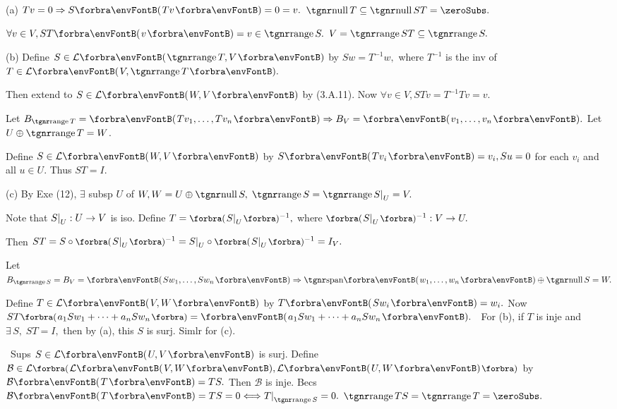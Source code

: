 \par\quad
(a) $Tv=0\Rightarrow S\Par{Tv}=0=v.$ \Or $\null T\subseteq\null ST=\zeroSubs.$\par\quad\Ha
$\forall v\in V,ST\Par{v}=v\in\range S.$ \;\Or $V=\range ST\subseteq\range S.$\par\vspace{2pt}\quad
(b) Define $S\in\Lm{\range T,V}$ by $Sw=T^{-1}w,$ {where $T^{-1}$ is the inv of $T\in\Lm{V,\range T}.$}\par\quad\Hb
Then extend to $S\in\Lm{W,V}$ by (3.A.11). Now $\forall v\in V,STv=T^{-1}Tv=v.$\par\vspace{4pt}\quad\Hb
\Or {} \;Let $B_{\range T}=\Par{Tv_1,\dots,Tv_n}\Rightarrow B_V=\Par{v_1,\dots,v_n}.$ Let $U\oplus\range T=W$.\par\quad\Hb
Define $S\in\Lm{W,V}$ by $S\Par{Tv_i}=v_i,Su=0$ for each $v_i$ and all $u\in U.$ Thus $ST=I.$\par\vspace{6pt}\quad
(c) By Exe (12), $\exists$ subsp $U$ of $W,W=U\oplus\null S,\;\range S=\range S\mmid_U=V.$\par\quad\Hc
Note that $S\text{\normalsize|}_U:U\rightarrow V$ is iso. Define $T=\BigPar{S\mmid_U}{^{-1}},$ where $\BigPar{S\mmid_U}{^{-1}}:V\rightarrow U.$\par\quad\Hc
Then $ST=S\circ\BigPar{S\mmid_U}{^{-1}}=S\mmid_U\circ\BigPar{S\mmid_U}{^{-1}}=I_V.$\par\vspace{4pt}\quad\Hc
\Or {} \;Let $B_{\range S}=B_{V}=\Par{Sw_1,\dots,Sw_n}\Rightarrow\Span{w_1,\dots,w_n}\oplus\null S=W.$\par\quad\Hc
Define $T\in\Lm{V,W}$ by $T\Par{Sw_i}=w_i.$ Now $ST\BigPar{a_1Sw_1+\dots+a_nSw_n}=\Par{a_1Sw_1+\dots+a_nSw_n}.$\PfEnd\vspace{4pt}
\Corollary \,\,\,For (b), if $T$ is inje and $\exists\,S,\;ST=I,$ then by (a), this $S$ is surj. Simlr for (c).
\SepLine

\BulletPointX{}\,\,\,Sups $S\in\Lm{U,V}$ is surj. Define $\mathcal{B}\in\Lm[\BigPar]{\Lm{V,W},\Lm{U,W}}$ by $\mathcal{B}\Par{T}=TS.$\TextB{}
Then $\mathcal{B}$ is inje. Becs {$\mathcal{B}\Par{T}=TS=0\Longleftrightarrow T\mmid_{\range S}=0.$ \;\Or $\range TS=\range T=\zeroSubs.$}\vspace{-3pt}
\SepLine

